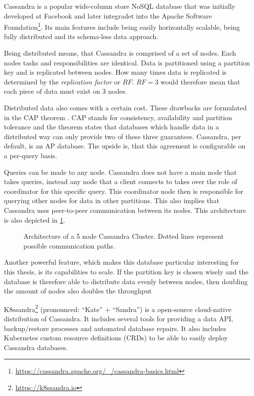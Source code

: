 Cassandra is a popular wide-column store NoSQL database that was initially developed at Facebook and later integradet into the Apache Software Foundation\footnote{\url{https://cassandra.apache.org/_/cassandra-basics.html}\label{fn:cassandra-basics}}. Its main features include being easily horizontally scalable, being fully distributed and its schema-less data approach.

Being distributed means, that Cassandra is comprised of a set of nodes. Each nodes tasks and responsibilities are identical. Data is partitioned using a partition key and is replicated between nodes. How many times data is replicated is determined by the \textit{replication factor} or \(RF\). \(RF = 3\) would therefore mean that each piece of data must exist on 3 nodes.

Distributed data also comes with a certain cost. These drawbacks are formulated in the CAP theorem \cite{foxHarvestYieldScalable1999a}. CAP stands for consistency, availability and partition tolerance and the theorem states that databases which handle data in a distributed way can only provide two of these three guarantees. Cassandra, per default, is an AP database. The upside is, that this agreement is configurable on a per-query basis.

Queries can be made to any node. Cassandra does not have a main node that takes queries, instead any node that a client connects to takes over the role of coordinator for this specific query. This coordinator node then is responsible for querying other nodes for data in other partitions. This also implies that Cassandra uses peer-to-peer communication between its nodes. This architecture is also depicted in \cref{fig:cassandra-architecture}.

\begin{figure}
    \centering
    \caption{Architecture of a 5 node Cassandra Cluster. Dotted lines represent possible communication paths.}
    \label{fig:cassandra-architecture}
\end{figure}

Another powerful feature, which makes this database particular interesting for this thesis, is its capabilities to scale. If the partition key is chosen wisely and the database is therefore able to distribute data evenly between nodes, then doubling the amount of nodes also doubles the throughput 

K8ssandra\footnote{\url{https://k8ssandra.io}} (pronounced: ``Kate'' +  ``Sandra'') is a open-source cloud-native distribution of Cassandra. It includes several tools for providing a data API, backup/restore processes and automated database repairs. It also includes Kubernetes custom resource definitions (CRDs) to be able to easily deploy Cassandra databases.
